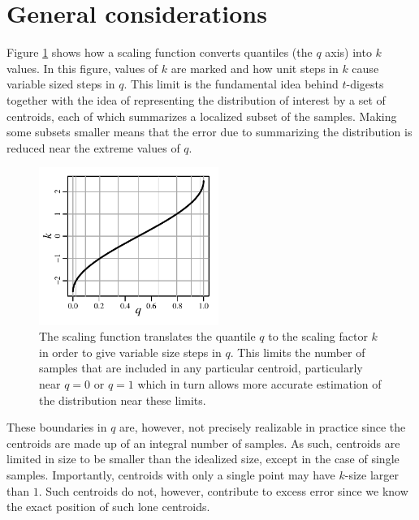 \documentclass[11pt]{amsart}
\begin{document}
\section{General considerations}
Figure \ref{fig:k-q-plot-full} shows how a scaling function converts quantiles (the $q$ axis) into $k$ values. In this figure, values of $k$ are marked  and how unit steps in $k$ cause variable sized steps in $q$. This limit is the fundamental idea behind $t$-digests together with the idea of representing the distribution of interest by a set of centroids, each of which summarizes a localized subset of the samples. Making some subsets smaller means that the error due to summarizing the distribution is reduced near the extreme values of $q$.
\begin{figure}[htbp] %
   \centering
   \includegraphics[width=2.3in]{../t-digest-paper/figures/k-q-plot.pdf} 
   \caption{The scaling function translates the quantile $q$ to the scaling factor $k$ in order to give variable size steps in $q$. This limits the number of samples that are included in any particular centroid, particularly near $q=0$ or $q=1$ which in turn allows more accurate estimation of the distribution near these limits. }
   \label{fig:k-q-plot-full}
\end{figure}

These boundaries in $q$ are, however, not precisely realizable in practice since the centroids are made up of an integral number of samples. As such, centroids are limited in size to be smaller than the idealized size, except in the case of single samples. Importantly, centroids with only a single point may have $k$-size larger than $1$. Such centroids do not, however, contribute to excess error since we know the exact position of such lone centroids.
\end{document}
